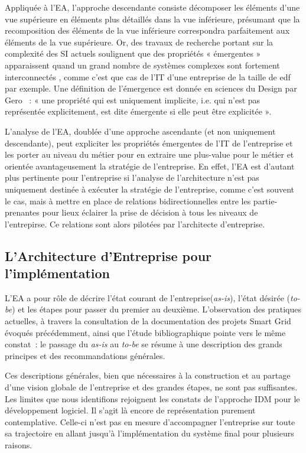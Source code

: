 	Appliquée à l'EA, l'approche descendante consiste décomposer les éléments d'une vue supérieure en éléments plus détaillés dans la vue inférieure, présumant que la recomposition des éléments de la vue inférieure correspondra parfaitement aux éléments de la vue supérieure. Or, des travaux de recherche portant sur la complexité des SI actuels soulignent que des propriétés « émergentes » apparaissent quand un grand nombre de systèmes complexes sont fortement interconnectés \cite{bullock2004complexity}, comme c'est que cas de l'IT d'une entreprise de la taille de \gls{edf} par exemple. Une définition de l'émergence est donnée en sciences du Design par Gero \cite{gero1992creativity}~: « une propriété qui est uniquement implicite, i.e. qui n'est pas représentée explicitement, est dite émergente si elle peut être explicitée ». 
	
	L'analyse de l'EA, doublée d'une approche ascendante (et non uniquement descendante), peut expliciter les propriétés émergentes de l'IT de l'entreprise et les porter au niveau du métier pour en extraire une plus-value pour le métier et orientée avantageusement la stratégie de l'entreprise. En effet, l'EA est d'autant plus pertinente pour l'entreprise si l'analyse de l'architecture n'est pas uniquement destinée à exécuter la stratégie de l'entreprise, comme c'est souvent le cas, mais à mettre en place de relations bidirectionnelles entre les partie-prenantes pour lieux éclairer la prise de décision à tous les niveaux de l'entrepirse. Ce relations sont alors pilotées par l'architecte d'entreprise. 
	
	
	\subsection{L'Architecture d'Entreprise pour l'implémentation}
	
	L'EA a pour rôle de décrire l'état courant de l'entreprise(\textit{as-is}), l'état désirée (\textit{to-be}) et les étapes pour passer du premier au deuxième. L'observation des pratiques actuelles, à travers la consultation de la documentation des projets Smart Grid évoqués précédemment, ainsi que l'étude bibliographique pointe vers le même constat~: le passage du \textit{as-is} au \textit{to-be} se résume à une description des grands principes et des recommandations générales. 
	
	Ces descriptions générales, bien que nécessaires à la construction et au partage d'une vision globale de l'entreprise et des grandes étapes, ne sont pas suffisantes. Les limites que nous identifions rejoignent les constats de l'approche IDM pour le développement logiciel. Il s'agit là encore de représentation purement contemplative. Celle-ci n'est pas en mesure d'accompagner l'entreprise sur toute sa trajectoire en allant jusqu'à l'implémentation du système final pour plusieurs raisons.
	
